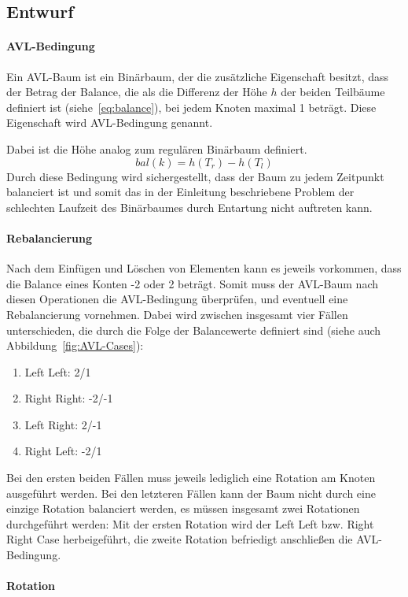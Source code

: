 \subsection{Entwurf}\label{subsec:entwurf}
\paragraph{AVL-Bedingung}
Ein AVL-Baum ist ein Binärbaum, der die zusätzliche Eigenschaft besitzt, dass
der Betrag der Balance, die als die Differenz der Höhe $h$ der beiden
Teilbäume definiert ist (siehe~\ref{eq:balance}), bei jedem Knoten maximal 1 beträgt.
Diese Eigenschaft wird AVL-Bedingung genannt.

Dabei ist die Höhe analog zum regulären Binärbaum definiert.
\begin{equation}
    bal(k) = h(T_r) - h(T_l)\label{eq:balance}
\end{equation}
Durch diese Bedingung wird sichergestellt, dass der Baum zu jedem Zeitpunkt
balanciert ist und somit das in der Einleitung beschriebene Problem der
schlechten Laufzeit des Binärbaumes durch Entartung nicht auftreten kann.

\paragraph{Rebalancierung}
Nach dem Einfügen und Löschen von Elementen kann es jeweils vorkommen, dass die
Balance eines Konten -2 oder 2 beträgt.
Somit muss der AVL-Baum nach diesen Operationen die AVL-Bedingung überprüfen,
und eventuell eine Rebalancierung vornehmen.
Dabei wird zwischen insgesamt vier Fällen unterschieden, die durch die Folge
der Balancewerte definiert sind (siehe auch Abbildung~\ref{fig:AVL-Cases}):
\begin{enumerate}
    \item Left Left: 2/1
    \item Right Right: -2/-1
    \item Left Right: 2/-1
    \item Right Left: -2/1
\end{enumerate}
Bei den ersten beiden Fällen muss jeweils lediglich eine Rotation am Knoten
ausgeführt werden.
Bei den letzteren Fällen kann der Baum nicht durch eine einzige Rotation
balanciert werden, es müssen insgesamt zwei Rotationen durchgeführt werden:
Mit der ersten Rotation wird der Left Left bzw. Right Right Case
herbeigeführt, die zweite Rotation befriedigt anschließen die AVL-Bedingung.

\paragraph{Rotation}

